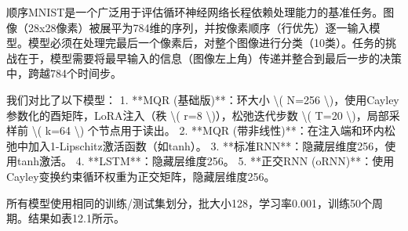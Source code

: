 \documentclass[
  12pt,
]{article}
\newenvironment{Shaded}{}{}
\newcommand{\DecValTok}[1]{\textcolor[rgb]{0.25,0.63,0.44}{#1}}
\newcommand{\FloatTok}[1]{\textcolor[rgb]{0.25,0.63,0.44}{#1}}
\newcommand{\NormalTok}[1]{#1}
\newcommand{\OperatorTok}[1]{\textcolor[rgb]{0.40,0.40,0.40}{#1}}
\begin{document}
\begin{Shaded}
\begin{Highlighting}[]
\NormalTok{顺序MNIST是一个广泛用于评估循环神经网络长程依赖处理能力的基准任务。图像（28x28像素）被展平为}\DecValTok{784}\NormalTok{维的序列，并按像素顺序（行优先）逐一输入模型。模型必须在处理完最后一个像素后，对整个图像进行分类（}\DecValTok{10}\NormalTok{类）。任务的挑战在于，模型需要将最早输入的信息（图像左上角）传递并整合到最后一步的决策中，跨越}\DecValTok{784}\NormalTok{个时间步。}

\NormalTok{我们对比了以下模型：}
\FloatTok{1.}  \OperatorTok{**}\NormalTok{MQR (基础版)}\OperatorTok{**}\NormalTok{：环大小 }\OperatorTok{\textbackslash{}}\NormalTok{( N}\OperatorTok{=}\DecValTok{256} \OperatorTok{\textbackslash{}}\NormalTok{)，使用Cayley参数化的酉矩阵，LoRA注入（秩 }\OperatorTok{\textbackslash{}}\NormalTok{( r}\OperatorTok{=}\DecValTok{8} \OperatorTok{\textbackslash{}}\NormalTok{)），松弛迭代步数 }\OperatorTok{\textbackslash{}}\NormalTok{( T}\OperatorTok{=}\DecValTok{20} \OperatorTok{\textbackslash{}}\NormalTok{)，局部采样前 }\OperatorTok{\textbackslash{}}\NormalTok{( k}\OperatorTok{=}\DecValTok{64} \OperatorTok{\textbackslash{}}\NormalTok{) 个节点用于读出。}
\FloatTok{2.}  \OperatorTok{**}\NormalTok{MQR (带非线性)}\OperatorTok{**}\NormalTok{：在注入端和环内松弛中加入}\DecValTok{1}\OperatorTok{{-}}\NormalTok{Lipschitz激活函数（如tanh）。}
\FloatTok{3.}  \OperatorTok{**}\NormalTok{标准RNN}\OperatorTok{**}\NormalTok{：隐藏层维度}\DecValTok{256}\NormalTok{，使用tanh激活。}
\FloatTok{4.}  \OperatorTok{**}\NormalTok{LSTM}\OperatorTok{**}\NormalTok{：隐藏层维度}\DecValTok{256}\NormalTok{。}
\FloatTok{5.}  \OperatorTok{**}\NormalTok{正交RNN (oRNN)}\OperatorTok{**}\NormalTok{：使用Cayley变换约束循环权重为正交矩阵，隐藏层维度}\DecValTok{256}\NormalTok{。}

\NormalTok{所有模型使用相同的训练}\OperatorTok{/}\NormalTok{测试集划分，批大小}\DecValTok{128}\NormalTok{，学习率}\FloatTok{0.001}\NormalTok{，训练}\DecValTok{50}\NormalTok{个周期。结果如表}\FloatTok{12.1}\NormalTok{所示。}


\end{Highlighting}
\end{Shaded}
\end{document}
